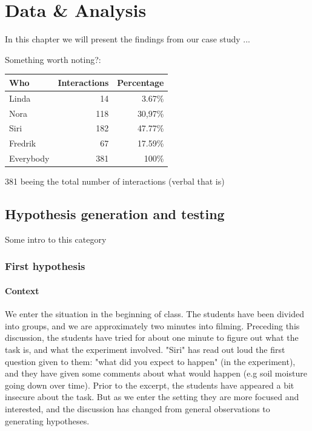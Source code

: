 \chapter{Data \& Analysis}
In this chapter we will present the findings from our case study ...

Something worth noting?:
\begin{table}[H]
\begin{center}
	\begin{tabular}{l r r } \toprule
	Who &  Interactions  & Percentage\\ \midrule  
	Linda &	 14  & 3.67\% \\
	Nora&	118 & 30,97\% \\ 
	Siri& 	182 & 47.77\% \\
	Fredrik& 67 & 17.59\% \\ \midrule
	Everybody &	381 & 100\%\\
	\bottomrule
	\end{tabular}
\end{center}
\end{table}
381 beeing the total number of interactions (verbal that is)



\section{Hypothesis generation and testing}
Some intro to this category
\subsection{First hypothesis}
\subsubsection*{Context}
\label{firsthypothesis}
We enter the situation in the beginning of class. The students have been divided into groups, and we are approximately two minutes into filming. Preceding this discussion, the students have tried for about one minute to figure out what the task is, and what the experiment involved. "Siri" has read out loud the first question given to them: "what did you expect to happen" (in the experiment), and they have given some comments about what would happen (e.g soil moisture going down over time). Prior to the excerpt, the students have appeared a bit insecure about the task. But as we enter the setting they are more focused and interested, and the discussion has changed from general observations to generating hypotheses.

